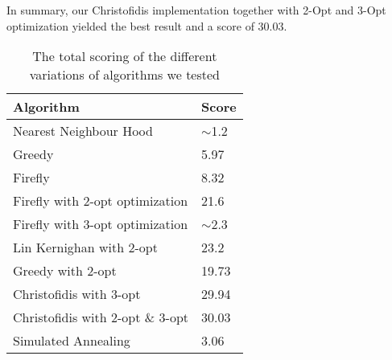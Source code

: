 \documentclass{article}
\begin{document}
In summary, our Christofidis implementation together with 2-Opt and 3-Opt optimization yielded the best result and a score of 30.03.

\begin{table}[H]
\centering
\begin{tabular}{|l|l|}
\hline
\textbf{Algorithm}               & \textbf{Score} \\ \hline
Nearest Neighbour Hood           & $\sim$1.2      \\ \hline
Greedy                           & 5.97           \\ \hline
Firefly                          & 8.32           \\ \hline
Firefly with 2-opt optimization  & 21.6           \\ \hline
Firefly with 3-opt optimization  & $\sim$2.3      \\ \hline
Lin Kernighan with 2-opt         & 23.2           \\ \hline
Greedy with 2-opt                & 19.73          \\ \hline
Christofidis with 3-opt          & 29.94          \\ \hline
Christofidis with 2-opt \& 3-opt & 30.03          \\ \hline
Simulated Annealing              & 3.06           \\ \hline
\end{tabular}
\caption{The total scoring of the different variations of algorithms we tested}
\end{table}

\printbibliography
\end{document}
